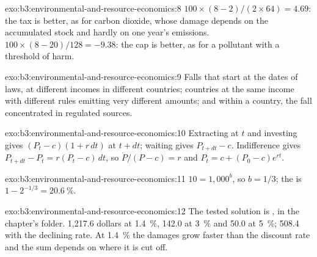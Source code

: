 \begin{solution}{exo:b3:environmental-and-resource-economics:8}
$100 \times (8 - 2)/(2 \times 64) = 4.69$: the tax is better, as for carbon dioxide, whose damage depends on the accumulated
stock and hardly on one year's emissions. $100 \times (8 - 20)/128 = -9.38$: the cap is better, as for a pollutant with a
threshold of harm.
\end{solution}

\begin{solution}{exo:b3:environmental-and-resource-economics:9}
Falls that start at the dates of laws, at different incomes in different
countries; countries at the same income with different rules emitting very
different amounts; and within a country, the fall concentrated in regulated sources.
\end{solution}

\begin{solution}{exo:b3:environmental-and-resource-economics:10}
Extracting at $t$ and investing gives $(P_t - c)(1 + r\,dt)$ at $t + dt$; waiting gives $P_{t+dt} - c$. Indifference gives $P_{t+dt} - P_t = r(P_t - c)\,dt$, so
$\dot P/(P - c) = r$ and $P_t = c + (P_0 - c)e^{rt}$.
\end{solution}

\begin{solution}{exo:b3:environmental-and-resource-economics:11}
$10 = 1{,}000^{b}$, so $b = 1/3$; the  is $1 - 2^{-1/3} = 20.6~\%$.
\end{solution}

\begin{solution}{exo:b3:environmental-and-resource-economics:12}
The tested solution is , in the chapter's 
folder. 1{,}217.6 dollars at 1.4~\%, 142.0 at 3~\% and 50.0 at 5~\%; 508.4 with the declining rate. At 1.4~\% the damages grow faster than
the discount rate and the sum depends on where it is cut off. %
\end{solution}

